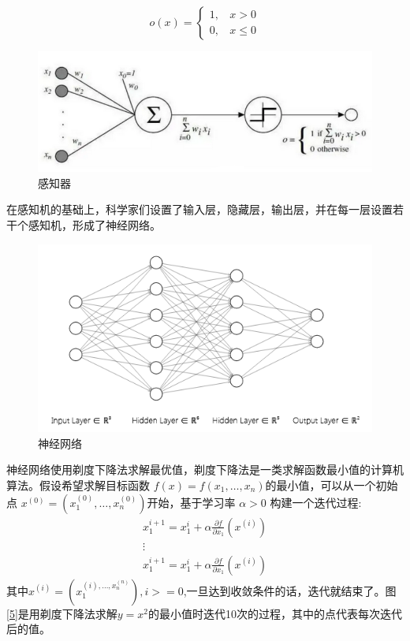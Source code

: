 $$	o(x)=\left\{\begin{array}{c}
		1 ,~~~~x>0 \\
		0, ~~~~x \leq 0
	\end{array}\right.
	$$
	\begin{figure}[h]
		\centering
		\includegraphics[scale=0.5,angle=0]{images/3.png}
		\caption{感知器}
		\label{3}
	\end{figure}
	在感知机的基础上，科学家们设置了输入层，隐藏层，输出层，并在每一层设置若干个感知机，形成了神经网络。
	\begin{figure}[h]
		\centering
		\includegraphics[scale=0.75,angle=0]{images/4.png}
		\caption{神经网络}
		\label{4}
	\end{figure}
	神经网络使用剃度下降法求解最优值，剃度下降法是一类求解函数最小值的计算机算法。假设希望求解目标函数 
	 $ f(x)=f(x_1,\dots ,x_n) $的最小值，可以从一个初始点 $ x^{(0)}=(x_1^{(0)},\dots ,x_n^{(0)}) $开始，基于学习率 $\alpha > 0$ 构建一个迭代过程:\begin{gather*}
x_1^{i+1}=x_1^{i}+\alpha \frac{\partial f}{\partial x_1}(x^{(i)})\\
 \vdots \\
x_1^{i+1}=x_1^{i}+\alpha \frac{\partial f}{\partial x_1}(x^{(i)})
\end{gather*}	 其中$x^{(i)}=(x_1^{(i),\dots,x_n^{(n)}}),i>=0$,一旦达到收敛条件的话，迭代就结束了。图\ref{5}是用剃度下降法求解$y=x^2$的最小值时迭代10次的过程，其中的点代表每次迭代后的值。
